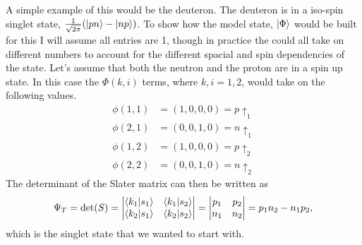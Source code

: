 A simple example of this would be the deuteron. The deuteron is in a iso-spin singlet state, $\frac{1}{\sqrt{2\pi}}(\left| pn \right>-\left| np \right>)$. To show how the model state, $\left| \Phi \right>$ would be built for this I will assume all entries are 1, though in practice the could all take on different numbers to account for the different spacial and spin dependencies of the state. Let's assume that both the neutron and the proton are in a spin up state. In this case the $\Phi(k,i)$ terms, where $k,i=1,2$, would take on the following values.
\begin{align}
   \phi(1,1)&=(1,0,0,0)=p\uparrow_1 \\
   \phi(2,1)&=(0,0,1,0)=n\uparrow_1 \\
   \phi(1,2)&=(1,0,0,0)=p\uparrow_2 \\
   \phi(2,2)&=(0,0,1,0)=n\uparrow_2
\end{align}
The determinant of the Slater matrix can then be written as
\begin{equation}
\Psi_T=\mathrm{det}(S)=
\begin{vmatrix}
    \left< k_1 | s_1 \right> & \left< k_1 | s_2 \right> \\
    \left< k_2 | s_1 \right> & \left< k_2 | s_2 \right>
\end{vmatrix}
=
\begin{vmatrix}
    p_1 & p_2 \\
    n_1 & n_2
\end{vmatrix}
=
p_1n_2-n_1p_2,
\end{equation}
which is the singlet state that we wanted to start with.
